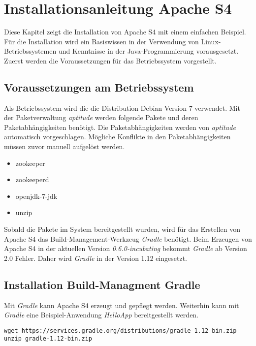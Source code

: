 \section{Installationsanleitung Apache S4}
\label{sec:s4install}

Diese Kapitel zeigt die Installation von Apache S4 mit einem einfachen Beispiel. Für die Installation wird ein Basiswissen in der Verwendung von Linux-Betriebssystemen und Kenntnisse in der Java-Programmierung vorausgesetzt. Zuerst werden die Voraussetzungen für das Betriebssystem vorgestellt.


\subsection{Voraussetzungen am Betriebssystem}

Als Betriebssystem wird die die Distribution Debian Version 7 verwendet. Mit der Paketverwaltung \textit{aptitude} werden folgende Pakete und deren Paketabhängigkeiten benötigt. Die Paketabhängigkeiten werden von \textit{aptitude} automatisch vorgeschlagen. Mögliche Konflikte in den Paketabhängigkeiten müssen zuvor manuell aufgelöst werden.

\begin{itemize}
	\item zookeeper
	\item zookeeperd
	\item openjdk-7-jdk
	\item unzip
\end{itemize}

Sobald die Pakete im System bereitgestellt wurden, wird für das Erstellen von Apache S4 das Build-Management-Werkzeug \textit{Gradle} benötigt. Beim Erzeugen von Apache S4 in der aktuellen Version \textit{0.6.0-incubating} bekommt \textit{Gradle} ab Version 2.0 Fehler. Daher wird \textit{Gradle} in der Version 1.12 eingesetzt.

\subsection{Installation Build-Managment Gradle}

Mit \textit{Gradle} kann Apache S4 erzeugt und gepflegt werden. Weiterhin kann mit \textit{Gradle} eine Beispiel-Anwendung \textit{HelloApp} bereitgestellt werden.

\begin{verbatim}
wget https://services.gradle.org/distributions/gradle-1.12-bin.zip
unzip gradle-1.12-bin.zip
\end{verbatim}

